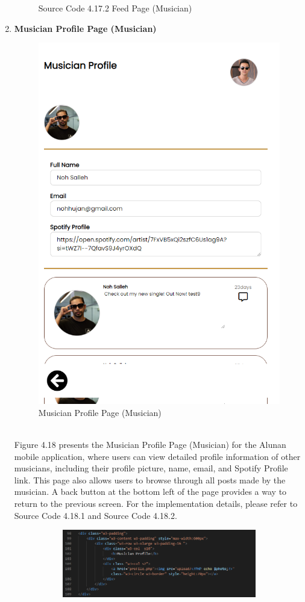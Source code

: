 \begin{enumerate}[1.]
\begin{figure}[h]
\begin{subfigure}[b]{0.8\textwidth}
            \label{fig:sub3}
        \end{subfigure}
        \caption*{Source Code 4.17.2 Feed Page (Musician)}
        \label{fig:myfig56b}
    \end{figure}
    \clearpage

    \item \textbf{Musician Profile Page (Musician)}
    \begin{figure}[h]
        \centering
        \includegraphics[width=0.5\linewidth]{mainmatter/images/frontend/ss/Musician Profile (Musician).png}
        \caption{Musician Profile Page (Musician)}
        \label{fig:myfig57}
    \end{figure} \\
    Figure 4.18 presents the Musician Profile Page (Musician) for the Alunan mobile application, where users can view detailed profile information of other musicians, including their profile picture, name, email, and Spotify Profile link. This page also allows users to browse through all posts made by the musician. A back button at the bottom left of the page provides a way to return to the previous screen. For the implementation details, please refer to Source Code 4.18.1 and Source Code 4.18.2.
    \clearpage
    \begin{figure}[h]\ContinuedFloat
        \centering
        \begin{subfigure}[b]{0.8\textwidth}
            \centering
            \includegraphics[width=\textwidth]{mainmatter/images/frontend/code/mprofile.png}

\end{subfigure}
\end{figure}
\end{enumerate}
